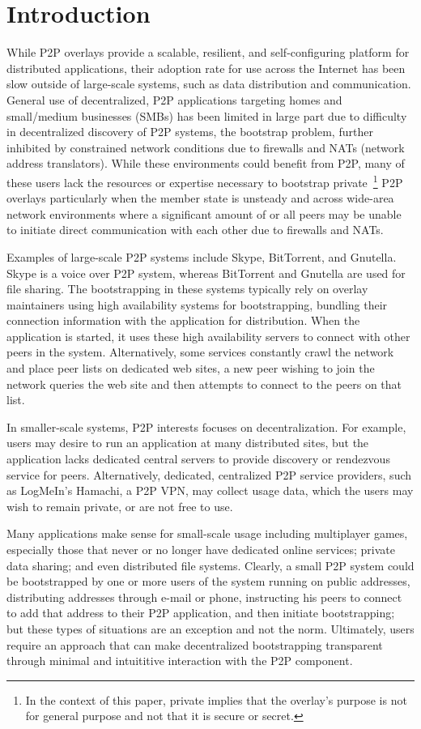 \documentclass[conference]{IEEEtran}
\begin{document}
\section{Introduction}

While P2P overlays provide a scalable, resilient, and self-configuring platform
for distributed applications, their adoption rate for use across the Internet
has been slow outside of large-scale systems, such as data distribution and
communication.  General use of decentralized, P2P applications targeting homes
and small/medium businesses (SMBs) has been limited in large part due to
difficulty in decentralized discovery of P2P systems, the bootstrap problem,
further inhibited by constrained network conditions due to firewalls and NATs
(network address translators).  While these environments could benefit from
P2P, many of these users lack the resources or expertise necessary to bootstrap
private~\footnote{In the context of this paper, private implies that the
overlay's purpose is not for general purpose and not that it is secure or
secret.}  P2P overlays particularly when the member state is unsteady and
across wide-area network environments where a significant amount of or all
peers may be unable to initiate direct communication with each other due to
firewalls and NATs.

Examples of large-scale P2P systems include Skype, BitTorrent, and Gnutella.
Skype is a voice over P2P system, whereas BitTorrent and Gnutella are used for
file sharing.  The bootstrapping in these systems typically rely on overlay
maintainers using high availability systems for bootstrapping, bundling their
connection information with the application for distribution.  When the
application is started, it uses these high availability servers to connect with
other peers in the system.  Alternatively, some services constantly crawl the
network and place peer lists on dedicated web sites, a new peer wishing to join
the network queries the web site and then attempts to connect to the peers on
that list.

In smaller-scale systems, P2P interests focuses on decentralization.  For
example, users may desire to run an application at many distributed sites, but
the application lacks dedicated central servers to provide discovery or
rendezvous service for peers.  Alternatively, dedicated, centralized P2P
service providers, such as LogMeIn's Hamachi, a P2P VPN, may collect usage
data, which the users may wish to remain private, or are not free to use.

Many applications make sense for small-scale usage including multiplayer games,
especially those that never or no longer have dedicated online services;
private data sharing; and even distributed file systems.  Clearly, a small P2P
system could be bootstrapped by one or more users of the system running on
public addresses, distributing addresses through e-mail or phone, instructing
his peers to connect to add that address to their P2P application, and then
initiate bootstrapping; but these types of situations are an exception and not
the norm.  Ultimately, users require an approach that can make decentralized
bootstrapping transparent through minimal and intuititive interaction with the
P2P component.
\end{document}
